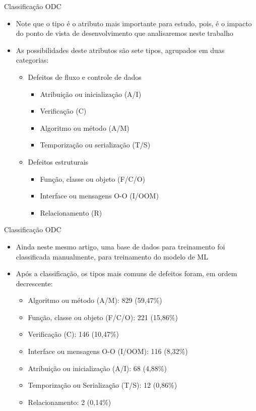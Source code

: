 \documentclass[brazilian]{beamer}
\begin{document}
\begin{frame}{Classificação ODC}
    \begin{itemize}
        \item Note que o tipo é o atributo mais importante para estudo, pois, é o impacto do ponto de vista de desenvolvimento que analisaremos neste trabalho
        \item As possibilidades deste atributos são sete tipos, agrupados em duas categorias:
        \begin{itemize}
            \item Defeitos de fluxo e controle de dados
            \begin{itemize}
                \item Atribuição ou inicialização (A/I)
                \item Verificação (C)
                \item Algoritmo ou método (A/M)
                \item Temporização ou serialização (T/S)
            \end{itemize}
            \item Defeitos estruturais
            \begin{itemize}
                \item Função, classe ou objeto (F/C/O)
                \item Interface ou mensagens O-O (I/OOM)
                \item Relacionamento (R)
            \end{itemize}
        \end{itemize}
    \end{itemize}
\end{frame}

\begin{frame}{Classificação ODC}
    \begin{itemize}
        \item Ainda neste mesmo artigo, uma base de dados para treinamento foi classificada manualmente, para treinamento do modelo de ML
        \item Após a classificação, os tipos mais comuns de defeitos foram, em ordem decrescente:
        \begin{itemize}
            \item Algoritmo ou método (A/M): 829 (59,47\%)
            \item Função, classe ou objeto (F/C/O): 221 (15,86\%)
            \item Verificação (C): 146 (10,47\%)
            \item Interface ou mensagens O-O (I/OOM): 116 (8,32\%)
            \item Atribuição ou inicialização (A/I): 68 (4,88\%)
            \item Temporização ou Serialização (T/S): 12 (0,86\%)
            \item Relacionamento: 2 (0,14\%)
        \end{itemize}
    \end{itemize}
\end{frame}
\end{document}
